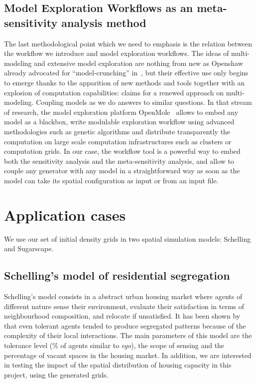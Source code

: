 \documentclass[Afour,sageh,times]{sagej}
\begin{document}
\subsection{Model Exploration Workflows as an meta-sensitivity analysis method}



The last methodological point which we need to emphasis is the relation between the workflow we introduce and model exploration workflows. The ideas of multi-modeling and extensive model exploration are nothing from new as Openshaw already advocated for ``model-crunching'' in~\cite{openshaw1983data}, but their effective use only begins to emerge thanks to the apparition of new methods and tools together with an explosion of computation capabilities: \cite{cottineau2016back} claims for a renewed approach on multi-modeling. Coupling models as we do answers to similar questions. In that stream of research, the model exploration platform OpenMole~\cite{reuillon2013openmole} allows to embed any model as a blackbox, write modulable exploration workflow using advanced methodologies such as genetic algorithms and distribute transparently the computation on large scale computation infrastructures such as clusters or computation grids. In our case, the workflow tool is a powerful way to embed both the sensitivity analysis and the meta-sensitivity analysis, and allow to couple any generator with any model in a straightforward way as soon as the model can take its spatial configuration as input or from an input file.




\section{Application cases}

We use our set of initial density grids in two spatial simulation models: Schelling and Sugarscape.


\subsection{Schelling's model of residential segregation}

Schelling's model consists in a abstract urban housing market where agents of different nature sense their environment, evaluate their satisfaction in terms of neighbourhood composition, and relocate if unsatisfied. It has been shown by \cite{Schelling1969} that even tolerant agents tended to produce segregated patterns because of the complexity of their local interactions. The main parameters of this model are the tolerance level (\% of agents similar to {\it ego}), the scope of sensing and the percentage of vacant spaces in the housing market. In addition, we are interested in testing the impact of the spatial distribution of housing capacity in this project, using the generated grids.
\end{document}
